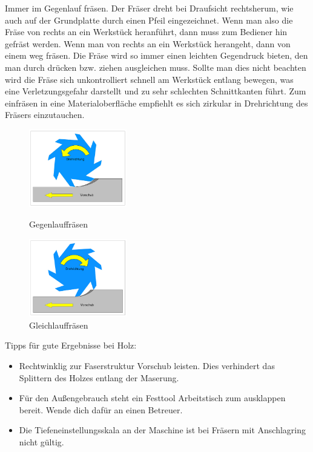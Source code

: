 \documentclass{\basedir/fablab-document}
\begin{document}
Immer im Gegenlauf fräsen. Der Fräser dreht bei Draufsicht rechtsherum, wie auch auf der Grundplatte durch einen Pfeil eingezeichnet. Wenn man also die Fräse von rechts an ein Werkstück heranführt, dann muss zum Bediener hin gefräst werden. Wenn man von rechts an ein Werkstück herangeht, dann von einem weg fräsen. Die Fräse wird so immer einen leichten Gegendruck bieten, den man durch drücken bzw. ziehen ausgleichen muss. Sollte man dies nicht beachten wird die Fräse sich unkontrolliert schnell am Werkstück entlang bewegen, was eine Verletzungsgefahr darstellt und zu sehr schlechten Schnittkanten führt. Zum einfräsen in eine Materialoberfläche empfiehlt es sich zirkular in Drehrichtung des Fräsers einzutauchen.

\begin{figure}[h!]
\begin{minipage}[t]{0.475\textwidth}
\centering
\includegraphics[height=34mm]{bilder/gegenlauf}
    \caption{Gegenlauffräsen}
    \label{gegenlauf}
\end{minipage}
\hfill
\begin{minipage}[t]{0.475\textwidth}
\centering
\includegraphics[height=34mm]{bilder/gleichlauf}
    \caption{Gleichlauffräsen}
    \label{gleichlauf}
\end{minipage}
\end{figure}

Tipps für gute Ergebnisse bei Holz:
\begin{itemize}
    \item Rechtwinklig zur Faserstruktur Vorschub leisten. Dies verhindert das Splittern des Holzes entlang der Maserung.
    \item Für den Außengebrauch steht ein Festtool Arbeitstisch zum ausklappen bereit. Wende dich dafür an einen Betreuer.
    \item Die Tiefeneinstellungsskala an der Maschine ist bei Fräsern mit Anschlagring nicht gültig. 
\end{itemize}
\end{document}
